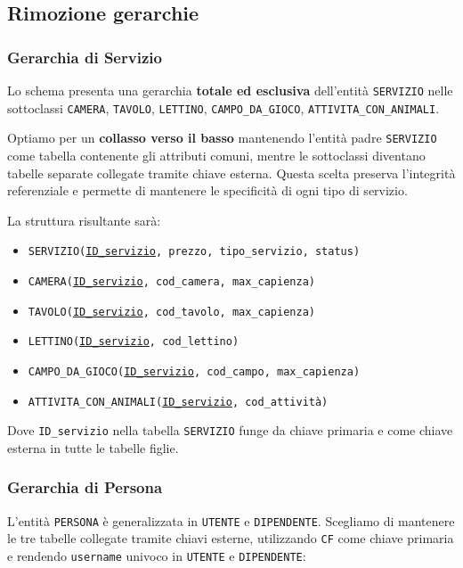 \documentclass[a4paper,12pt]{report}
\begin{document}
\subsection{Rimozione gerarchie}

\subsubsection*{Gerarchia di Servizio}
Lo schema presenta una gerarchia \textbf{totale ed esclusiva} dell'entità \texttt{SERVIZIO} nelle sottoclassi
\texttt{CAMERA}, \texttt{TAVOLO}, \texttt{LETTINO}, \texttt{CAMPO\_DA\_GIOCO}, \texttt{ATTIVITA\_CON\_ANIMALI}.

Optiamo per un \textbf{collasso verso il basso} mantenendo l'entità padre \texttt{SERVIZIO} come tabella contenente gli
attributi comuni, mentre le sottoclassi diventano tabelle separate collegate tramite chiave esterna. Questa scelta preserva
l'integrità referenziale e permette di mantenere le specificità di ogni tipo di servizio.

\vspace{\baselineskip}
\noindent La struttura risultante sarà:
\begin{itemize}
	\item \texttt{SERVIZIO(\underline{ID\_servizio}, prezzo, tipo\_servizio, status)}
	\item \texttt{CAMERA(\underline{ID\_servizio}, cod\_camera, max\_capienza)}
	\item \texttt{TAVOLO(\underline{ID\_servizio}, cod\_tavolo, max\_capienza)}
	\item \texttt{LETTINO(\underline{ID\_servizio}, cod\_lettino)}
	\item \texttt{CAMPO\_DA\_GIOCO(\underline{ID\_servizio}, cod\_campo, max\_capienza)}
	\item \texttt{ATTIVITA\_CON\_ANIMALI(\underline{ID\_servizio}, cod\_attività)}
\end{itemize}

Dove \texttt{ID\_servizio} nella tabella \texttt{SERVIZIO} funge da chiave primaria e come chiave esterna in tutte le
tabelle figlie.

\subsubsection*{Gerarchia di Persona}
L'entità \texttt{PERSONA} è generalizzata in \texttt{UTENTE} e \texttt{DIPENDENTE}. Scegliamo di mantenere le tre tabelle
collegate tramite chiavi esterne, utilizzando \texttt{CF} come chiave primaria e rendendo \texttt{username} univoco in \texttt{UTENTE} e \texttt{DIPENDENTE}:
\end{document}
